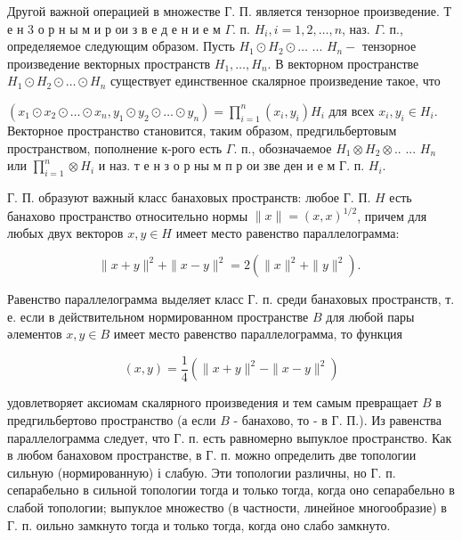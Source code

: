 \documentclass[10pt]{article}
\begin{document}
Другой важной операцией в множестве Г. П. является тензорное произведение. Т е н 3 о р н ы м и р ои з в е д е н и е м $\Gamma$. п. $H_{i}, i=1,2, \ldots, n$, наз. $\Gamma$. п., определяемое следующим образом. Пусть $H_{1} \odot H_{2} \odot \ldots$ ... $H_{n}-$ тензорное произведение векторных пространств $H_{1}, \ldots, H_{n}$. В векторном пространстве $H_{1} \odot H_{2} \odot \ldots \odot H_{n}$ существует единственное скалярное произведение такое, что



$\left(x_{1} \odot x_{2} \odot \ldots \odot x_{n}, y_{1} \odot y_{2} \odot \ldots \odot y_{n}\right)=\prod_{i=1}^{n}\left(x_{i}, y_{i}\right) H_{i}$ для всех $x_{i}, y_{i} \in H_{i}$. Векторное пространство становится, таким образом, предгильбертовым пространством, пополнение к-рого есть $\Gamma$. п., обозначаемое $H_{1} \otimes H_{2} \otimes .$. ... $H_{n}$ или $\prod_{i=1}^{n} \otimes H_{i}$ и наз. т е н з о р ны м п р ои зве ден и е м Г. п. $H_{i}$.



Г. П. образуют важный класс банаховых пространств: любое Г. П. $H$ есть банахово пространство относительно нормы $\|x\|=(x, x)^{1 / 2}$, причем для любых двух векторов $x, y \in H$ имеет место равенство параллелограмма:



\[

\|x+y\|^{2}+\|x-y\|^{2}=2\left(\|x\|^{2}+\|y\|^{2}\right) \text {. }

\]



Равенство параллелограмма выделяет класс Г. п. среди банаховых пространств, т. е. если в действительном нормированном пространстве $B$ для любой пары әлементов $x, y \in B$ имеет место равенство параллелограмма, то функция



\[

(x, y)=\frac{1}{4}\left(\|x+y\|^{2}-\|x-y\|^{2}\right)

\]



удовлетворяет аксиомам скалярного произведения и тем самым превращает $B$ в предгильбертово пространство (а если $B$ - банахово, то - в $Г$. П.). Из равенства параллелограмма следует, что Г. п. есть равномерно выпуклое пространство. Как в любом банаховом пространстве, в Г. п. можно определить две топологии сильную (нормированную) і слабую. Эти топологии различны, но Г. п. сепарабельно в сильной топологии тогда и только тогда, когда оно сепарабельно в слабой топологии; выпуклое множество (в частности, линейное многообразие) в Г. п. оильно замкнуто тогда и только тогда, когда оно слабо замкнуто.
\end{document}
